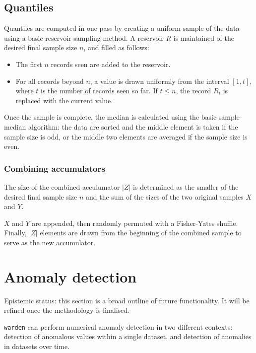 \documentclass[a4paper]{article}
\begin{document}
\subsection{Quantiles}\label{quantiles}

Quantiles are computed in one pass by creating a uniform sample of the
data using a basic reservoir
sampling\cite{vitter1985}\cite[pp.~144-145]{Knuth1997} method. A
reservoir \(R\) is maintained of the desired final sample size \(n\),
and filled as follows:

\begin{itemize}
\item
The first \(n\) records seen are added to the reservoir.

\item
For all records beyond \(n\), a value is drawn uniformly from the
interval \([1, t]\), where \(t\) is the number of records seen so
far. If \(t \leq n\), the record \(R_t\) is replaced with the current value.
\end{itemize}

Once the sample is complete, the median is calculated using the basic
sample-median algorithm: the data are sorted and the middle element is
taken if the sample size is odd, or the middle two elements are
averaged if the sample size is even.

\subsubsection{Combining accumulators}

The size of the combined acculumator \(|Z|\) is determined as
the smaller of the desired final sample size \(n\) and the sum of the
sizes of the two original samples \(X\) and \(Y\).

\(X\) and \(Y\) are appended, then randomly permuted with a
Fisher-Yates shuffle\cite[pp.~145-146]{Knuth1997}. Finally, \(|Z|\) elements are drawn from the
beginning of the combined sample to serve as the new accumulator.

\section{Anomaly detection}\label{anomaly-detection}

Epistemic status: this section is a broad outline of future
functionality. It will be refined once the methodology is finalised.

\texttt{warden} can perform numerical anomaly detection in two
different contexts: detection of anomalous values within a single
dataset, and detection of anomalies in datasets over time.
\end{document}
